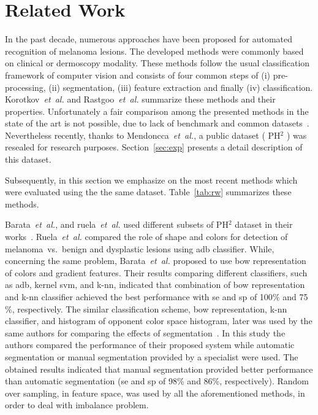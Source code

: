 \section{Related Work}
\label{sec:rw}
In the past decade, numerous approaches have been proposed for automated recognition of melanoma lesions.
The developed methods were commonly based on clinical or dermoscopy modality.
These methods follow the usual classification framework of computer vision and consists of four common steps of (i) pre-processing, (ii) segmentation, (iii) feature extraction and finally (iv) classification.
Korotkov~\emph{et~al.}\cite{korotkov2012computerized} and Rastgoo~\emph{et~al.}\cite{rastgoo2015automatic} summarize these methods and their properties.
Unfortunately a fair comparison among the presented methods in the state of the art is not possible, due to lack of benchmark and common datasets~\cite{rastgoo2015automatic,korotkov2012computerized}.
Nevertheless recently, thanks to Mendoncca~\emph{et~al.}\cite{mendoncca2013ph}, a public dataset ( PH$^{2}$ ) was resealed for research purposes.
Section~\ref{sec:exp} presents a detail description of this dataset.

Subsequently, in this section we emphasize on the most recent methods which were evaluated using the the same dataset.
Table~\ref{tab:rw} summarizes these methods.

Barata~\emph{et~al.}\cite{barata2013two,barata2013role}, and ruela~\emph{et~al.}\cite{ruela2013role,ruela2013color} used different subsets of PH$^{2}$ dataset in their works~\cite{mendoncca2013ph}.
Ruela~\emph{et~al.}\cite{ruela2013role,ruela2013color} compared the role of shape and colors for detection of melanoma~vs.~benign and dysplastic lesions using \ac{adb} classifier.
While, concerning the same problem, Barata~\emph{et~al.}\cite{barata2013two} proposed to use \ac{bow} representation of colors and gradient features.
Their results comparing different classifiers, such as \ac{adb}, kernel \ac{svm}, and k-\ac{nn}, indicated that combination of \ac{bow} representation and k-\ac{nn} classifier achieved the best performance with \ac{se} and \ac{sp} of 100$\%$ and 75$\%$, respectively.
The similar classification scheme, \ac{bow} representation, k-\ac{nn} classifier, and histogram of opponent color space histogram, later was used by the same authors for comparing the effects of segmentation~\cite{barata2013towards}.
In this study the authors compared the performance of their proposed system while automatic segmentation or manual segmentation provided by a specialist were used.
The obtained results indicated that manual segmentation provided better performance than automatic segmentation (\ac{se} and \ac{sp} of 98\% and 86\%, respectively).
Random over sampling, in feature space, was used by all the aforementioned methods, in order to deal with imbalance problem. 

